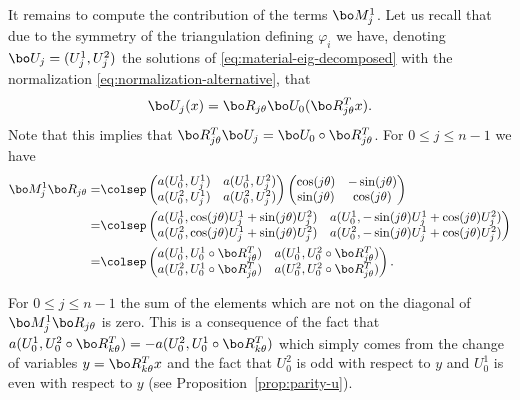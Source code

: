 It remains to compute the contribution of the terms $\bo M_j^1$. Let us recall that due to the symmetry of the triangulation defining $\varphi_i$ we have, denoting $\bo U_j = (U_j^1,U_j^2)$ the solutions of \eqref{eq:material-eig-decomposed} with the normalization \eqref{eq:normalization-alternative}, that
\[
\bo U_j(x) = \bo R_{j\theta} \bo U_0(\bo R_{j\theta}^Tx).
\]
Note that this implies that $\bo R_{j\theta}^T \bo U_j = \bo U_0 \circ \bo R_{j\theta}^T$.
For $0\leq j \leq n-1$ we have\vspace*{-3pt}
\begin{align*}
\bo M_j^1 \bo R_{j\theta} = & \colsep\begin{pmatrix}
a(U_0^1,U_j^1) & a(U_0^1,U_j^2) \\
a(U_0^2,U_j^1) & a(U_0^2,U_j^2)
\end{pmatrix}
\begin{pmatrix}
\cos (j\theta) & -\sin(j\theta) \\
\sin(j\theta) & \cos(j\theta)
\end{pmatrix}\\
= &\colsep \begin{pmatrix}
a(U_0^1,\cos(j\theta)U_j^1+\sin(j\theta)U_j^2) & a(U_0^1,-\sin(j\theta)U_j^1+\cos(j\theta)U_j^2) \\
a(U_0^2,\cos(j\theta)U_j^1+\sin(j\theta)U_j^2) & a(U_0^2,-\sin(j\theta)U_j^1+\cos(j\theta)U_j^2)
\end{pmatrix} \\
= & \colsep\begin{pmatrix}
a(U_0^1,U_0^1\circ \bo R_{j\theta}^T) & a(U_0^1,U_0^2\circ \bo R_{j\theta}^T) \\
a(U_0^2,U_0^1\circ \bo R_{j\theta}^T) & a(U_0^2,U_0^2\circ \bo R_{j\theta}^T)
\end{pmatrix}.
\end{align*}

\begin{rem}
For $0\leq j \leq n-1$ the sum of the elements which are not on the diagonal of $\bo M_j^1 \bo R_{j\theta}$ is zero. This is a consequence of the fact that $a(U_0^1,U_0^2\circ\bo R_{k\theta}^T) = -a(U_0^2,U_0^1\circ\bo R_{k\theta}^T)$ which simply comes from the change of variables $y = \bo R_{k\theta}^Tx$ and the fact that $U_0^2$ is odd with respect to $y$ and $U_0^1$ is even with respect to $y$ (see Proposition~\ref{prop:parity-u}).
\label{rem:zerooffdiagsum-M1}
\end{rem}

